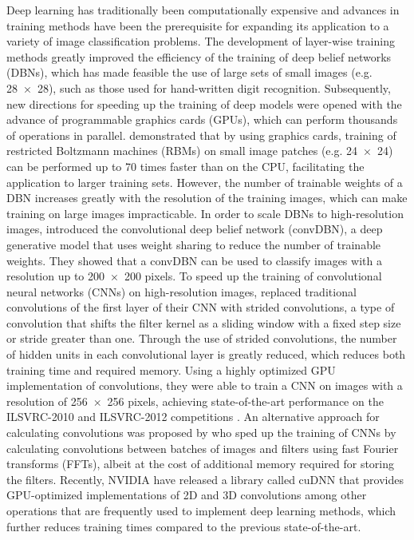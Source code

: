 Deep learning has traditionally been computationally expensive and advances in
training methods have been the prerequisite for expanding its application to a
variety of image classification problems. The development of layer-wise training
methods \citep{hinton2006b} greatly improved the efficiency of the training of
deep belief networks (DBNs), which has made feasible the use of large sets of
small images (e.g. \num{28x28}), such as those used for hand-written digit
recognition. Subsequently, new directions for speeding up the training of deep
models were opened with the advance of programmable graphics cards (GPUs), which
can perform thousands of operations in parallel. \citet{raina2009} demonstrated
that by using graphics cards, training of restricted Boltzmann machines (RBMs)
on small image patches (e.g. \num{24x24}) can be performed up to \num{70} times
faster than on the CPU, facilitating the application to larger training sets.
However, the number of trainable weights of a DBN increases greatly with the
resolution of the training images, which can make training on large images
impracticable. In order to scale DBNs to high-resolution images,
\citet{lee2009,lee2011} introduced the convolutional deep belief network
(convDBN), a deep generative model that uses weight sharing to reduce the number
of trainable weights. They showed that a convDBN can be used to classify images
with a resolution up to \num{200x200} pixels. To speed up the training of
convolutional neural networks (CNNs) on high-resolution images,
\citet{krizhevsky2012} replaced traditional convolutions of the first layer of
their CNN with strided convolutions, a type of convolution that shifts the
filter kernel as a sliding window with a fixed step size or stride greater than
one. Through the use of strided convolutions, the number of hidden units in each
convolutional layer is greatly reduced, which reduces both training time and
required memory. Using a highly optimized GPU implementation of convolutions,
they were able to train a CNN on images with a resolution of \num{256x256}
pixels, achieving state-of-the-art performance on the ILSVRC-2010 and
ILSVRC-2012 competitions \citep{krizhevsky2012}. An alternative approach for
calculating convolutions was proposed by \citet{mathieu2013} who sped up the
training of CNNs by calculating convolutions between batches of images and
filters using fast Fourier transforms (FFTs), albeit at the cost of additional
memory required for storing the filters. Recently, NVIDIA have released a
library called cuDNN \cite{chetlur2014} that provides GPU-optimized
implementations of 2D and 3D convolutions among other operations that are
frequently used to implement deep learning methods, which further reduces
training times compared to the previous state-of-the-art.

